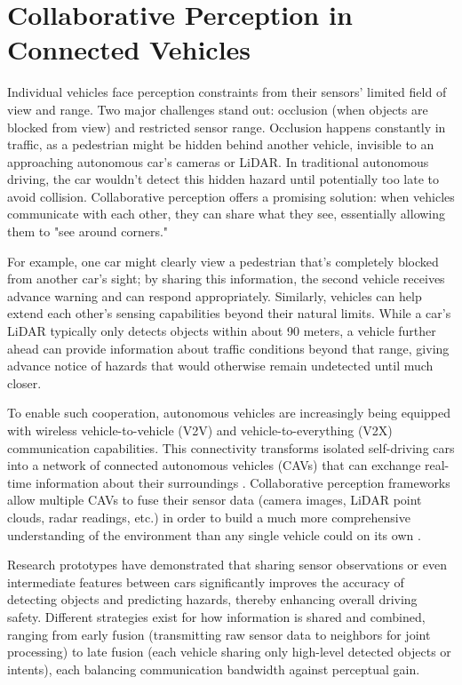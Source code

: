\section{Collaborative Perception in Connected Vehicles}
Individual vehicles face perception constraints from their sensors' limited field of view and range. Two major challenges stand out: occlusion (when objects are blocked from view) and restricted sensor range. Occlusion happens constantly in traffic, as a pedestrian might be hidden behind another vehicle, invisible to an approaching autonomous car's cameras or LiDAR.
In traditional autonomous driving, the car wouldn't detect this hidden hazard until potentially too late to avoid collision. Collaborative perception offers a promising solution: when vehicles communicate with each other, they can share what they see, essentially allowing them to "see around corners."

For example, one car might clearly view a pedestrian that's completely blocked from another car's sight; by sharing this information, the second vehicle receives advance warning and can respond appropriately. Similarly, vehicles can help extend each other's sensing capabilities beyond their natural limits.
While a car's LiDAR typically only detects objects within about 90 meters, a vehicle further ahead can provide information about traffic conditions beyond that range, giving advance notice of hazards that would otherwise remain undetected until much closer.

To enable such cooperation, autonomous vehicles are increasingly being equipped with wireless vehicle-to-vehicle (V2V) and vehicle-to-everything (V2X) communication capabilities. This connectivity transforms isolated self-driving cars into a network of connected autonomous vehicles (CAVs) that can exchange real-time information about their surroundings \cite{Han_2023}.
Collaborative perception frameworks allow multiple CAVs to fuse their sensor data (camera images, LiDAR point clouds, radar readings, etc.) in order to build a much more comprehensive understanding of the environment than any single vehicle could on its own \cite{Huang_2025}.

Research prototypes have demonstrated that sharing sensor observations or even intermediate features between cars significantly improves the accuracy of detecting objects and predicting hazards, thereby enhancing overall driving safety.
Different strategies exist for how information is shared and combined, ranging from early fusion (transmitting raw sensor data to neighbors for joint processing) to late fusion (each vehicle sharing only high-level detected objects or intents), each balancing communication bandwidth against perceptual gain.

